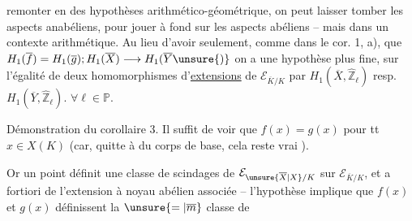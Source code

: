 remonter en des hypothèses   arithmético-géométrique, on peut laisser tomber les aspects anabéliens, pour jouer à fond sur les aspects abéliens -- mais dans un contexte arithmétique. Au lieu d'avoir  seulement, comme dans le cor. 1, a),  que $H_1(\overline f)=H_1(\overline g);H_1(\overline X)\longrightarrow H_1(\overline Y\unsure{)}$ on a une hypothèse plus fine, sur l'égalité de deux homomorphismes d'\uline{extensions} de $\mathcal E_{\overline K/K}$ par $H_1(\overline X,\widehat{\mathbb Z}_\ell)$ resp. $H_1(\overline Y,\widehat{\mathbb Z}_\ell)$. $\forall\ell\in\mathbb P$.

Démonstration du corollaire 3.
Il suffit de voir que $f(x)=g(x)$ pour tt $x\in X(K)$ (car, quitte à   du corps de base, cela reste vrai  ). 

Or un point définit une classe de   scindages de $\mathcal E_{\unsure{\overline X|X}/K}$ sur $\mathcal E_{\overline K/K}$, et a fortiori de l'extension à noyau abélien associée -- l'hypothèse implique que $f(x)$ et $g(x)$ définissent la $\unsure{=|\overline m}$ classe de
